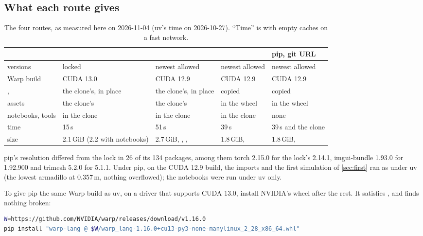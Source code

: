 \subsection{What each route gives}\label{sec:routes}

\begin{table}[h]
\centering
\caption{The four routes, as measured here on 2026-11-04 (uv's time on 2026-10-27). ``Time'' is with empty caches on a fast network.}
\label{tab:routes}
\small
\begin{tabularx}{\linewidth}{@{}L{30mm}YYYY@{}}
\toprule
 &  &  &  & pip, git URL \\
\midrule
versions & locked & newest allowed & newest allowed & newest allowed \\
Warp build & CUDA 13.0 & CUDA 12.9 & CUDA 12.9 & CUDA 12.9 \\
,  & the clone's, in place & the clone's, in place & copied & copied \\
assets & the clone's & the clone's & in the wheel & in the wheel \\
notebooks, tools & in the clone & in the clone & in the clone & none \\
time & 15\,s & 51\,s & 39\,s & 39\,s and the clone \\
size & 2.1\,GiB (2.2 with notebooks) & 2.7\,GiB, , ,  & 1.8\,GiB,  & 1.8\,GiB,  \\
\bottomrule
\end{tabularx}
\end{table}

pip's resolution differed from the lock in 26 of its 134 packages, among them torch 2.15.0 for the lock's 2.14.1, imgui-bundle 1.93.0 for 1.92.900 and trimesh 5.2.0 for 5.1.1. Under pip, on the CUDA 12.9 build, the imports and the first simulation of \cref{sec:first} ran as under uv (the lowest armadillo at 0.357\,m, nothing overflowed); the notebooks were run under uv only.

To give pip the same Warp build as uv, on a driver that supports CUDA 13.0, install NVIDIA's wheel after the rest. It satisfies , and  finds nothing broken:

\begin{lstlisting}[language=bash]
W=https://github.com/NVIDIA/warp/releases/download/v1.16.0
pip install "warp-lang @ $W/warp_lang-1.16.0+cu13-py3-none-manylinux_2_28_x86_64.whl"
\end{lstlisting}

